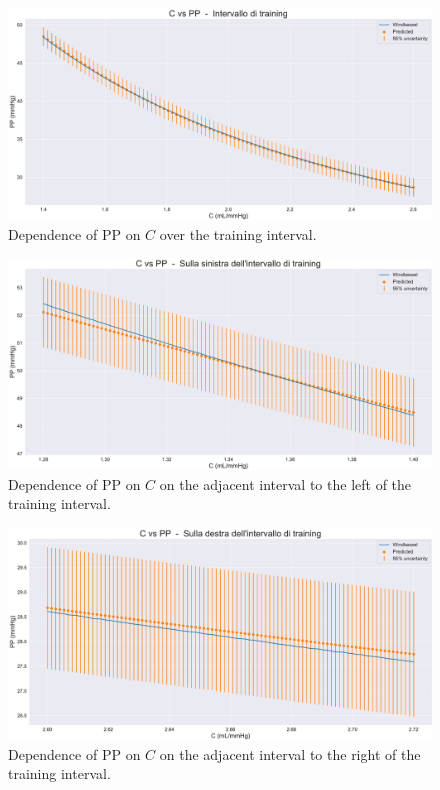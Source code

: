 \vspace{0.32cm}

\begin{figure}[!htb]
    \centering
    \includegraphics[width=1\textwidth]{images/Training (risultati)/PP/PP - C - training.pdf}
    \caption{Dependence of PP on $C$ over the training interval.}
    \label{PP - C - training}
\end{figure}

\begin{figure}
    \centering
    \includegraphics[width=1\textwidth]{images/Training (risultati)/PP/PP - C - sx.pdf}
    \caption{Dependence of PP on $C$ on the adjacent interval to the left of the training interval.}
    \label{PP - C - sx}
\end{figure}



\begin{figure}
    \centering
    \includegraphics[width=1\textwidth]{images/Training (risultati)/PP/PP - C - dx.pdf}
    \caption{Dependence of PP on $C$ on the adjacent interval to the right of the training interval.}
    \label{PP - C - dx}
\end{figure}




